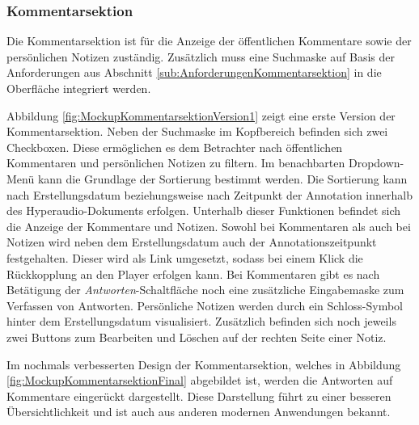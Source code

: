 
\subsubsection{Kommentarsektion}
Die Kommentarsektion ist für die Anzeige der öffentlichen Kommentare sowie der persönlichen Notizen zuständig. Zusätzlich muss eine Suchmaske auf Basis der Anforderungen aus Abschnitt \ref{sub:AnforderungenKommentarsektion} in die Oberfläche integriert werden.

Abbildung \ref{fig:MockupKommentarsektionVersion1} zeigt eine erste Version der Kommentarsektion. Neben der Suchmaske im Kopfbereich befinden sich zwei Checkboxen. Diese ermöglichen es dem Betrachter nach öffentlichen Kommentaren und persönlichen Notizen zu filtern. Im benachbarten Dropdown-Menü kann die Grundlage der Sortierung bestimmt werden. Die Sortierung kann nach Erstellungsdatum beziehungsweise nach Zeitpunkt der Annotation innerhalb des Hyperaudio-Dokuments erfolgen. Unterhalb dieser Funktionen befindet sich die Anzeige der Kommentare und Notizen. Sowohl bei Kommentaren als auch bei Notizen wird neben dem Erstellungsdatum auch der Annotationszeitpunkt festgehalten. Dieser wird als Link umgesetzt, sodass bei einem Klick die Rückkopplung an den Player erfolgen kann. Bei Kommentaren gibt es nach Betätigung der \textit{Antworten}-Schaltfläche noch eine zusätzliche Eingabemaske zum Verfassen von Antworten. Persönliche Notizen werden durch ein Schloss-Symbol hinter dem Erstellungsdatum visualisiert. Zusätzlich befinden sich noch jeweils zwei Buttons zum Bearbeiten und Löschen auf der rechten Seite einer Notiz.


Im nochmals verbesserten Design der Kommentarsektion, welches in Abbildung \ref{fig:MockupKommentarsektionFinal} abgebildet ist, werden die Antworten auf Kommentare eingerückt dargestellt. Diese Darstellung führt zu einer besseren Übersichtlichkeit und ist auch aus anderen modernen Anwendungen bekannt.

